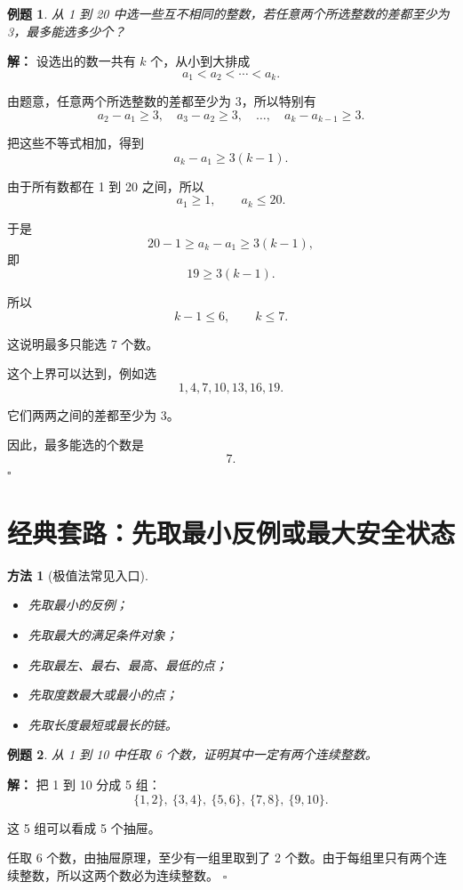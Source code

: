 \documentclass[11pt,a4paper,fontset=fandol]{ctexart}
\theoremstyle{formaltheorem}
\newtheorem{method}{方法}[section]
\theoremstyle{formalexample}
\newtheorem{example}{例题}[section]
\newenvironment{solution}{\par\noindent\textbf{解：}}{\hfill$\square$\par}
\begin{document}
\begin{example}
从 1 到 20 中选一些互不相同的整数，若任意两个所选整数的差都至少为 3，最多能选多少个？
\end{example}

\begin{solution}
设选出的数一共有 $k$ 个，从小到大排成
\[
a_1<a_2<\cdots<a_k.
\]

由题意，任意两个所选整数的差都至少为 3，所以特别有
\[
a_2-a_1\ge 3,\quad a_3-a_2\ge 3,\quad \ldots,\quad a_k-a_{k-1}\ge 3.
\]

把这些不等式相加，得到
\[
a_k-a_1\ge 3(k-1).
\]

由于所有数都在 1 到 20 之间，所以
\[
a_1\ge 1,\qquad a_k\le 20.
\]

于是
\[
20-1\ge a_k-a_1\ge 3(k-1),
\]
即
\[
19\ge 3(k-1).
\]

所以
\[
k-1\le 6,\qquad k\le 7.
\]

这说明最多只能选 7 个数。

这个上界可以达到，例如选
\[
1,4,7,10,13,16,19.
\]

它们两两之间的差都至少为 3。

因此，最多能选的个数是
\[
\boxed{7}.
\]
\end{solution}

\section{经典套路：先取最小反例或最大安全状态}

\begin{method}[极值法常见入口]
\begin{itemize}
  \item 先取最小的反例；
  \item 先取最大的满足条件对象；
  \item 先取最左、最右、最高、最低的点；
  \item 先取度数最大或最小的点；
  \item 先取长度最短或最长的链。
\end{itemize}
\end{method}

\begin{example}
从 1 到 10 中任取 6 个数，证明其中一定有两个连续整数。
\end{example}

\begin{solution}
把 1 到 10 分成 5 组：
\[
\{1,2\},\ \{3,4\},\ \{5,6\},\ \{7,8\},\ \{9,10\}.
\]

这 5 组可以看成 5 个抽屉。

任取 6 个数，由抽屉原理，至少有一组里取到了 2 个数。由于每组里只有两个连续整数，所以这两个数必为连续整数。
\end{solution}
\end{document}
